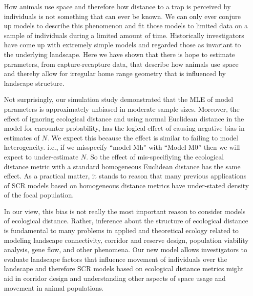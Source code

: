 \documentclass[12pt]{article}
\begin{document}
How animals use space and therefore how distance to a trap is
perceived by individuals is not something that can ever be known. We
can only ever conjure up models to describe this
phenomenon and fit those models to limited data on a sample of individuals
during a limited amount of time.
Historically investigators have come up with extremely simple
models and regarded those as invariant to
the underlying landscape. Here we have shown that there is hope to
estimate parameters, from capture-recapture data,
 that describe how animals use space and thereby
allow for irregular home range geometry that is influenced by
landscape structure.

Not surprisingly, our simulation study demonstrated that the MLE of model
parameters is approximately unbiased in moderate sample
sizes. Moreover, the
effect of ignoring ecological distance and using normal Euclidean
distance in the model for encounter probability, has the
logical effect of causing negative bias
in estimates of $N$. 
We expect this because the effect is similar to
failing to model heterogeneity. i.e., if we misspecify ``model Mh'' \citep{otis_etal:1978} with
``Model M0'' \citep{otis_etal:1978} then we will expect to under-estimate $N$. So the effect of
mis-specifiying the ecological distance metric with a standard
homogeneous Euclidean distance has the same effect. As a practical matter,
it stands to reason that many previous applications of SCR models based
on homogeneous distance metrics have under-stated density of the focal
population.

In our view, this bias is not really the most important reason to consider models of
ecological distance. Rather, inference about the structure of
ecological distance is fundamental to many problems in applied and
theoretical ecology related to modeling landscape
connectivity, corridor and reserve design, population viability
analysis, gene flow, and other phenomena.
Our new model
allows investigators to  evaluate landscape
factors that influence movement of individuals over the landscape and
therefore SCR models based on ecological distance metrics might aid in
corridor design and understanding other aspects of space usage and
movement in animal populations.
\end{document}
